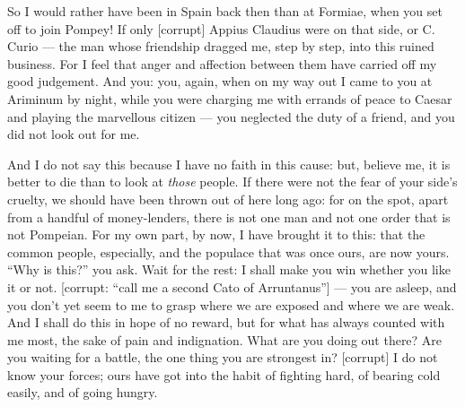 

 So I would rather have been in Spain back then than at Formiae, when you set off to join Pompey! If only [corrupt] Appius Claudius were on that side, or C. Curio --- the man whose friendship dragged me, step by step, into this ruined business. For I feel that anger and affection between them have carried off my good judgement. And you: you, again, when on my way out I came to you at Ariminum by night, while you were charging me with errands of peace to Caesar and playing the marvellous citizen --- you neglected the duty of a friend, and you did not look out for me.

 And I do not say this because I have no faith in this cause: but, believe me, it is better to die than to look at \emph{those} people. If there were not the fear of your side's cruelty, we should have been thrown out of here long ago: for on the spot, apart from a handful of money-lenders, there is not one man and not one order that is not Pompeian. For my own part, by now, I have brought it to this: that the common people, especially, and the populace that was once ours, are now yours. ``Why is this?'' you ask. Wait for the rest: I shall make you win whether you like it or not. [corrupt: ``call me a second Cato of Arruntanus''] --- you are asleep, and you don't yet seem to me to grasp where we are exposed and where we are weak. And I shall do this in hope of no reward, but for what has always counted with me most, the sake of pain and indignation. What are you doing out there? Are you waiting for a battle, the one thing you are strongest in? [corrupt] I do not know your forces; ours have got into the habit of fighting hard, of bearing cold easily, and of going hungry.
